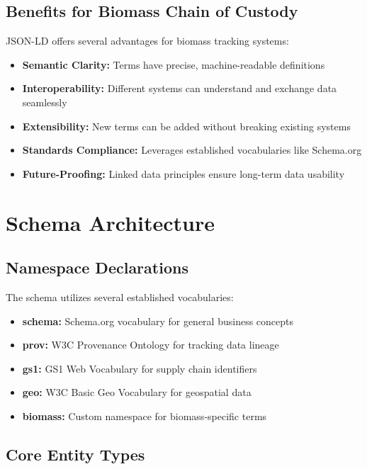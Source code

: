 \documentclass{article}
\begin{document}
\subsection{Benefits for Biomass Chain of Custody}

JSON-LD offers several advantages for biomass tracking systems:

\begin{itemize}[noitemsep]
    \item \textbf{Semantic Clarity:} Terms have precise, machine-readable definitions
    \item \textbf{Interoperability:} Different systems can understand and exchange data seamlessly
    \item \textbf{Extensibility:} New terms can be added without breaking existing systems
    \item \textbf{Standards Compliance:} Leverages established vocabularies like Schema.org
    \item \textbf{Future-Proofing:} Linked data principles ensure long-term data usability
\end{itemize}

\section{Schema Architecture}

\subsection{Namespace Declarations}

The schema utilizes several established vocabularies:

\begin{itemize}[noitemsep]
    \item \textbf{schema:} Schema.org vocabulary for general business concepts
    \item \textbf{prov:} W3C Provenance Ontology for tracking data lineage
    \item \textbf{gs1:} GS1 Web Vocabulary for supply chain identifiers
    \item \textbf{geo:} W3C Basic Geo Vocabulary for geospatial data
    \item \textbf{biomass:} Custom namespace for biomass-specific terms
\end{itemize}

\subsection{Core Entity Types}
\end{document}
